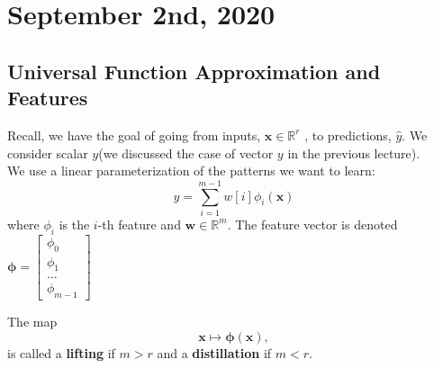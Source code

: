 \documentclass[11pt]{article}
\newcommand{\R}{\mathbb{R}}
\newcommand{\Vw}{\mathbf{w}}
\newcommand{\Vx}{\mathbf{x}}
\begin{document}
\section{September 2nd, 2020}
\subsection{Universal Function Approximation and Features}

Recall, we have the goal of going from inputs, $\Vx \in \R^r$ , to predictions, $\hat{y}$.  We consider scalar $y$(we discussed the case of vector $y$ in the previous lecture). \\
We use a linear parameterization of the patterns we want to learn:
$$y = \sum_{i=1}^{m-1} w[i]\phi_i(\Vx)$$
where $\phi_i$ is the $i$-th feature and $\Vw \in \R^m$.
The feature vector is denoted $\mathbf{\phi} = \begin{bmatrix}
\phi_0 \\ \phi_1 \\ \dots \\ \phi_{m-1}
\end{bmatrix}$

The map $$\Vx \mapsto \mathbf{\phi}(\Vx),$$
is called a \textbf{lifting} if $m > r$ and a \textbf{distillation} if $m < r$.
\end{document}
